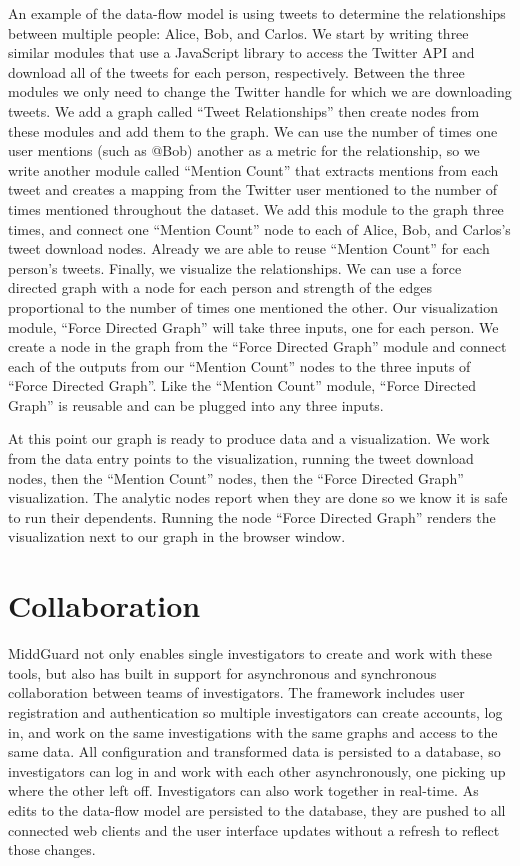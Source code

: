 \documentclass[midd]{thesis}
\begin{document}
An example of the data-flow model is using tweets to determine the relationships
between multiple people: Alice, Bob, and Carlos. We start by writing three
similar modules that use a JavaScript library to access the Twitter API and
download all of the tweets for each person, respectively. Between the three
modules we only need to change the Twitter handle for which we are downloading
tweets. We add a graph called ``Tweet Relationships'' then create nodes from
these modules and add them to the graph. We can use the number of times one user
mentions (such as @Bob) another as a metric for the relationship, so we write
another module called ``Mention Count'' that extracts mentions from each tweet
and creates a mapping from the Twitter user mentioned to the number of times
mentioned throughout the dataset. We add this module to the graph three times,
and connect one ``Mention Count'' node to each of Alice, Bob, and Carlos's tweet
download nodes. Already we are able to reuse ``Mention Count'' for each person's
tweets. Finally, we visualize the relationships. We can use a force directed
graph with a node for each person and strength of the edges proportional to the
number of times one mentioned the other. Our visualization module, ``Force
Directed Graph'' will take three inputs, one for each person. We create a node
in the graph from the ``Force Directed Graph'' module and connect each of the
outputs from our ``Mention Count'' nodes to the three inputs of ``Force Directed
Graph''. Like the ``Mention Count'' module, ``Force Directed Graph'' is reusable
and can be plugged into any three inputs.

At this point our graph is ready to produce data and a visualization. We work
from the data entry points to the visualization, running the tweet download
nodes, then the ``Mention Count'' nodes, then the ``Force Directed Graph''
visualization. The analytic nodes report when they are done so we know it is
safe to run their dependents. Running the node ``Force Directed Graph'' renders
the visualization next to our graph in the browser window.

\section{Collaboration}

MiddGuard not only enables single investigators to create and work with these
tools, but also has built in support for asynchronous and synchronous
collaboration between teams of investigators. The framework includes user
registration and authentication so multiple investigators can create accounts,
log in, and work on the same investigations with the same graphs and access to
the same data. All configuration and transformed data is persisted to a
database, so investigators can log in and work with each other asynchronously,
one picking up where the other left off. Investigators can also work together in
real-time. As edits to the data-flow model are persisted to the database, they
are pushed to all connected web clients and the user interface updates without a
refresh to reflect those changes.
\end{document}
